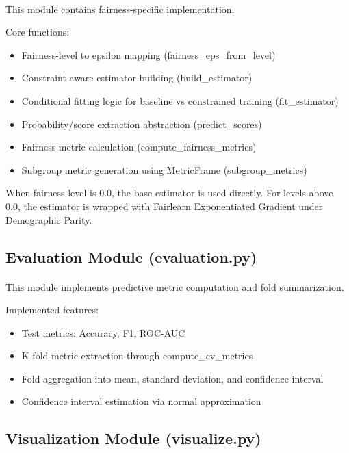 \paragraph{}

This module contains fairness-specific implementation.

Core functions:
\begin{itemize}
    \item Fairness-level to epsilon mapping (fairness\_eps\_from\_level)
    \item Constraint-aware estimator building (build\_estimator)
    \item Conditional fitting logic for baseline vs constrained training (fit\_estimator)
    \item Probability/score extraction abstraction (predict\_scores)
    \item Fairness metric calculation (compute\_fairness\_metrics)
    \item Subgroup metric generation using MetricFrame (subgroup\_metrics)
\end{itemize}

When fairness level is 0.0, the base estimator is used directly. For levels above 0.0, the estimator is wrapped with Fairlearn Exponentiated Gradient under Demographic Parity.

\subsection{Evaluation Module (evaluation.py)}
\paragraph{}

This module implements predictive metric computation and fold summarization.

Implemented features:
\begin{itemize}
    \item Test metrics: Accuracy, F1, ROC-AUC
    \item K-fold metric extraction through compute\_cv\_metrics
    \item Fold aggregation into mean, standard deviation, and confidence interval
    \item Confidence interval estimation via normal approximation
\end{itemize}

\subsection{Visualization Module (visualize.py)}
